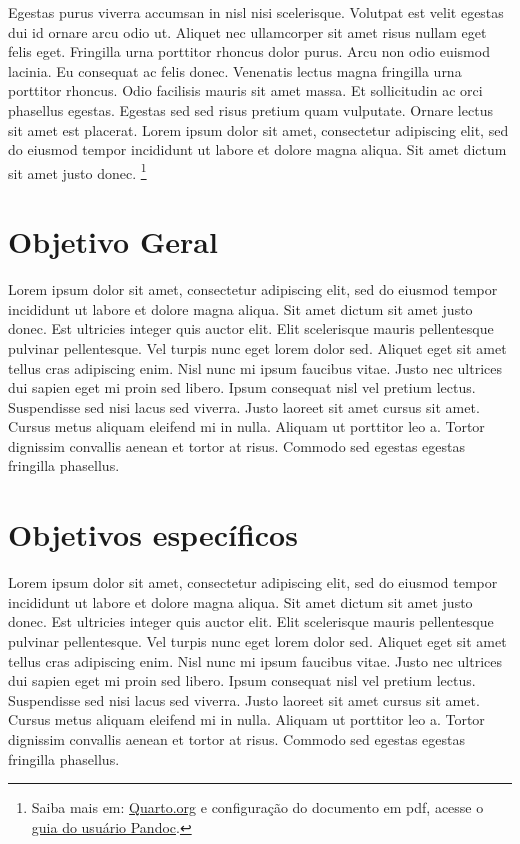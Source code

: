 \documentclass[
  a4paper,
]{report}
\begin{document}
Egestas purus viverra accumsan in nisl nisi scelerisque. Volutpat est
velit egestas dui id ornare arcu odio ut. Aliquet nec ullamcorper sit
amet risus nullam eget felis eget. Fringilla urna porttitor rhoncus
dolor purus. Arcu non odio euismod lacinia. Eu consequat ac felis donec.
Venenatis lectus magna fringilla urna porttitor rhoncus. Odio facilisis
mauris sit amet massa. Et sollicitudin ac orci phasellus egestas.
Egestas sed sed risus pretium quam vulputate. Ornare lectus sit amet est
placerat. Lorem ipsum dolor sit amet, consectetur adipiscing elit, sed
do eiusmod tempor incididunt ut labore et dolore magna aliqua. Sit amet
dictum sit amet justo donec. \footnote{Saiba mais em:
  \href{https://quarto.org/docs/output-formats/pdf-basics.html}{Quarto.org}
  e configuração do documento em pdf, acesse o
  \href{https://pandoc.org/MANUAL.html\#variables-for-latex}{guia do
  usuário Pandoc}.}

\hypertarget{objetivo-geral}{%
\section{Objetivo Geral}\label{objetivo-geral}}

Lorem ipsum dolor sit amet, consectetur adipiscing elit, sed do eiusmod
tempor incididunt ut labore et dolore magna aliqua. Sit amet dictum sit
amet justo donec. Est ultricies integer quis auctor elit. Elit
scelerisque mauris pellentesque pulvinar pellentesque. Vel turpis nunc
eget lorem dolor sed. Aliquet eget sit amet tellus cras adipiscing enim.
Nisl nunc mi ipsum faucibus vitae. Justo nec ultrices dui sapien eget mi
proin sed libero. Ipsum consequat nisl vel pretium lectus. Suspendisse
sed nisi lacus sed viverra. Justo laoreet sit amet cursus sit amet.
Cursus metus aliquam eleifend mi in nulla. Aliquam ut porttitor leo a.
Tortor dignissim convallis aenean et tortor at risus. Commodo sed
egestas egestas fringilla phasellus.

\hypertarget{objetivos-especuxedficos}{%
\section{Objetivos específicos}\label{objetivos-especuxedficos}}

Lorem ipsum dolor sit amet, consectetur adipiscing elit, sed do eiusmod
tempor incididunt ut labore et dolore magna aliqua. Sit amet dictum sit
amet justo donec. Est ultricies integer quis auctor elit. Elit
scelerisque mauris pellentesque pulvinar pellentesque. Vel turpis nunc
eget lorem dolor sed. Aliquet eget sit amet tellus cras adipiscing enim.
Nisl nunc mi ipsum faucibus vitae. Justo nec ultrices dui sapien eget mi
proin sed libero. Ipsum consequat nisl vel pretium lectus. Suspendisse
sed nisi lacus sed viverra. Justo laoreet sit amet cursus sit amet.
Cursus metus aliquam eleifend mi in nulla. Aliquam ut porttitor leo a.
Tortor dignissim convallis aenean et tortor at risus. Commodo sed
egestas egestas fringilla phasellus.
\end{document}
